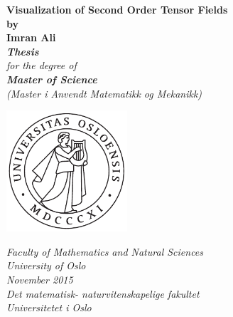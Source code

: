 \documentclass[main.tex]{subfiles}
\begin{document}
\thispagestyle{empty}
\begin{center}        %
  \vspace{5mm}          %
  \LARGE
  \textbf{Visualization of Second Order Tensor Fields} \\
  \Large
  \vspace{5mm}
  \textbf{by} \\
  \vspace{5mm}
  \large
  \textbf{Imran Ali} \\
  \vspace{25mm}
  \Large
  {\bf{\textsl{Thesis}}} \\
  \textsl{for the degree of} \\
  \vspace{2mm}
  {\bf{\textsl{Master of Science}}} \\
  \vspace{5mm}
  {\large \textsl {(Master i Anvendt Matematikk og Mekanikk)}}\\
  \vspace{10mm}
  \centerline{\includegraphics[width=45mm,height=45mm,natwidth=5.01,natheight=5.01]{../figures/uiosegl_pdf.pdf}} 
  \vspace{8mm}
  \textsl{Faculty of Mathematics and Natural Sciences} \\
  \textsl{University of Oslo} \\
  \vspace{5mm}
  \large
  \textsl{November 2015} \\
  \vspace{5mm}
  \normalsize
  \textsl{Det matematisk- naturvitenskapelige fakultet} \\
  \textsl{Universitetet i Oslo} \\
\end{center}
\end{document}
